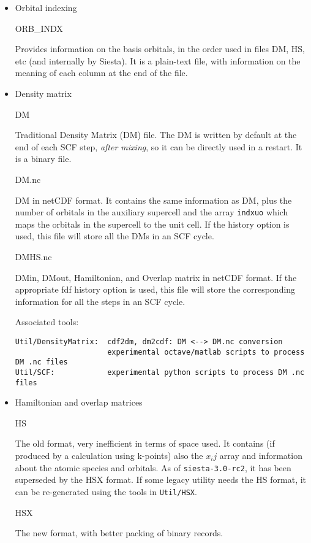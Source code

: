 \begin{itemize}
\item{Orbital indexing}

ORB\_INDX

Provides information on the basis orbitals, in the order used in files 
DM, HS, etc (and internally by Siesta). It is a plain-text file, with
information on the meaning of each column at the end of the file.

\item{Density matrix}

DM

Traditional Density Matrix (DM) file. The DM is written by default at
the end of each SCF step, \emph{after mixing}, so it can be directly used
in a restart. It is a binary file.

DM.nc

DM in netCDF format. It contains the same information as DM, plus the
number of orbitals in the auxiliary supercell and the array \texttt{indxuo}
which maps the orbitals in the supercell to the unit cell.  If the history
option is used, this file will store all the DMs in an SCF cycle.

DMHS.nc

DMin, DMout, Hamiltonian, and Overlap matrix in netCDF format. If the
appropriate fdf history option is used, this file will store the
corresponding information for all the steps in an SCF cycle.

Associated tools:

\begin{verbatim}
Util/DensityMatrix:  cdf2dm, dm2cdf: DM <--> DM.nc conversion
                     experimental octave/matlab scripts to process DM .nc files
Util/SCF:            experimental python scripts to process DM .nc files
\end{verbatim}

\item{Hamiltonian and overlap matrices}

HS

The old format, very inefficient in terms of space used. It contains
(if produced by a calculation using k-points) also the $x_ij$ array
and information about the atomic species and orbitals. As of
\texttt{siesta-3.0-rc2}, it has been superseded by the HSX format. If some
legacy utility needs the HS format, it can be re-generated using
the tools in \texttt{Util/HSX}.

HSX

The new format, with better packing of binary records.


\end{itemize}
